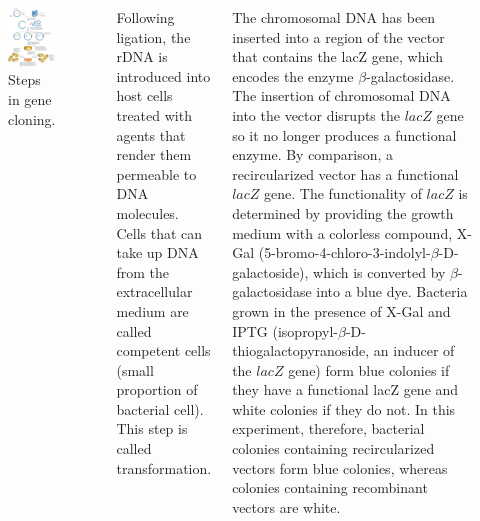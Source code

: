 \documentclass[
  ignorenonframetext,
  aspectratio=169]{beamer}
\newcommand{\bcolumns}{\begin{columns}[T, onlytextwidth]}
\newcommand{\ecolumns}{\end{columns}}
\begin{document}
\begin{frame}{}
\protect\hypertarget{section-3}{}
\bcolumns
{}

\begin{figure}
\includegraphics[width=0.86\linewidth]{../images/steps_in_gene_cloning} \caption{Steps in gene cloning.}\label{fig:steps-gene-cloning}
\end{figure}


\scriptsize

Following ligation, the rDNA is introduced into host cells treated with
agents that render them permeable to DNA molecules. Cells that can take
up DNA from the extracellular medium are called competent cells (small
proportion of bacterial cell). This step is called transformation.

The chromosomal DNA has been inserted into a region of the vector that
contains the lacZ gene, which encodes the enzyme
\(\beta\)-galactosidase. The insertion of chromosomal DNA into the
vector disrupts the \(lacZ\) gene so it no longer produces a functional
enzyme. By comparison, a recircularized vector has a functional \(lacZ\)
gene. The functionality of \(lacZ\) is determined by providing the
growth medium with a colorless compound, X-Gal
(5-bromo-4-chloro-3-indolyl-\(\beta\)-D-galactoside), which is converted
by \(\beta\)-galactosidase into a blue dye. Bacteria grown in the
presence of X-Gal and IPTG (isopropyl-\(\beta\)-D-thiogalactopyranoside,
an inducer of the \(lacZ\) gene) form blue colonies if they have a
functional lacZ gene and white colonies if they do not. In this
experiment, therefore, bacterial colonies containing recircularized
vectors form blue colonies, whereas colonies containing recombinant
vectors are white.

\ecolumns
\end{frame}
\end{document}
